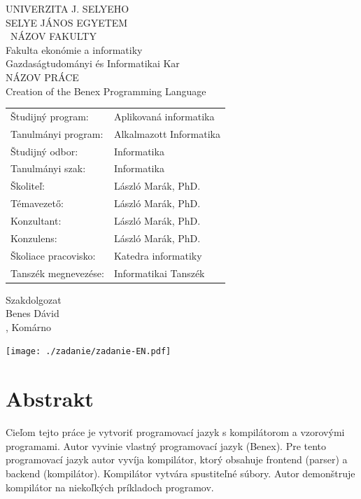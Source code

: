 \documentclass[a4paper,oneside,onecolumn,12pt]{LegrandOrangeBook}
\newcommand{\chpt}[1]{\chapter*{#1}\addcontentsline{toc}{section}{#1}}
\begin{document}
\begingroup
\makeatletter
\let\ps@plain\ps@empty
\begin{minipage}[c][\textheight][c]{\textwidth}
	{
        \centering
	    {\large UNIVERZITA J. SELYEHO\\SELYE JÁNOS EGYETEM} \\
	    \vskip0.5cm
        {\ NÁZOV FAKULTY\\Fakulta ekonómie a informatiky\\Gazdaságtudományi és Informatikai Kar} \\
        \vfill
        {\Large NÁZOV PRÁCE\\Creation of the Benex Programming Language } \\
        \vfill
        \thispagestyle{empty}
        \begin{tabular}{ll}
            Študijný program:    & Aplikovaná informatika \\
            Tanulmányi program:  & Alkalmazott Informatika \\
            Študijný odbor:      & Informatika \\
            Tanulmányi szak:     & Informatika \\
            Školiteľ:            & László Marák, PhD. \\
            Témavezető:          & László Marák, PhD. \\
            Konzultant:          & László Marák, PhD. \\
            Konzulens:           & László Marák, PhD. \\
            Školiace pracovisko: & Katedra informatiky \\
            Tanszék megnevezése: & Informatikai Tanszék \\
        \end{tabular}
        \vfill
        Szakdolgozat \\
        Benes Dávid \\
        \hfill\the\year{}, Komárno\hfill
	}
\end{minipage}
\endgroup

{
    \hspace*{-2cm}
    \texttt{[image: ./zadanie/zadanie-EN.pdf]}
}

\tableofcontents
\pagebreak

\chpt{Abstrakt}\label{sec:abstrakt}
Cieľom tejto práce je vytvoriť programovací jazyk s kompilátorom a vzorovými programami. Autor vyvinie vlastný programovací jazyk (Benex). Pre tento programovací jazyk autor vyvíja kompilátor, ktorý obsahuje frontend (parser) a backend (kompilátor). Kompilátor vytvára spustiteľné súbory. Autor demonštruje kompilátor na niekoľkých príkladoch programov.
\end{document}
